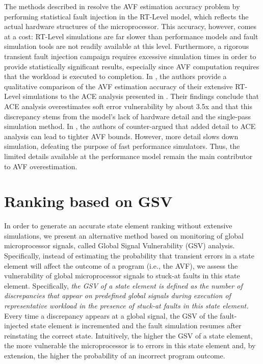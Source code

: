 \documentclass[12pt]{yalephd}
\begin{document}
The methods described in \cite{WMP07,CzSi90,KiSo02} resolve the AVF estimation accuracy problem by performing statistical fault injection in the RT-Level model, which reflects the actual hardware structures of the microprocessor. This accuracy, however, comes at a cost: RT-Level simulations are far slower than performance models and fault simulation tools are not readily available at this level. Furthermore, a rigorous transient fault injection campaign requires excessive simulation times in order to provide statistically significant results, especially since AVF computation requires that the workload is executed to completion. In \cite{WMP07}, the authors provide a qualitative comparison of the AVF estimation accuracy of their extensive RT-Level simulations to the ACE analysis presented in \cite{MWERA03}. Their findings conclude that ACE analysis overestimates soft error vulnerability by about 3.5x and that this discrepancy stems from the model's lack of hardware detail and the single-pass simulation method. In \cite{biswas2008computing}, the authors of \cite{WMP07} counter-argued that added detail to ACE analysis can lead to tighter AVF bounds. However, more detail slows down simulation, defeating the purpose of fast performance simulators. Thus, the limited details available at the performance model remain the main contributor to AVF overestimation.

\section{Ranking based on GSV} \label{sC4sCROC_descr}

In order to generate an accurate state element ranking without extensive simulations, we present an alternative method based on monitoring of global microprocessor signals, called Global Signal Vulnerability (GSV) analysis. Specifically, instead of estimating the probability that transient errors in a state element will affect the outcome of a program (i.e., the AVF), we assess the vulnerability of global microprocessor signals to stuck-at faults in this state element. Specifically, {\em the GSV of a state element is defined as the number of discrepancies that appear on predefined global signals during execution of representative workload in the presence of stuck-at faults in this state element.} Every time a discrepancy appears at a global signal, the GSV of the fault-injected state element is incremented and the fault simulation resumes after reinstating the correct state. Intuitively, the higher the GSV of a state element, the more vulnerable the microprocessor is to errors in this state element and, by extension, the higher the probability of an incorrect program outcome.
\end{document}

